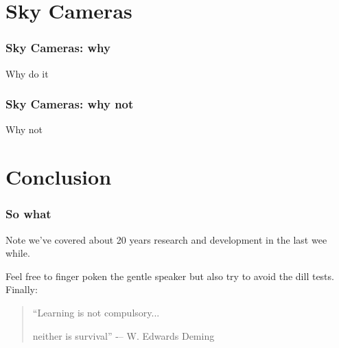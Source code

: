 \documentclass{beamer}
\begin{document}
\section{Sky Cameras}
\begin{frame}\frametitle{Sky Cameras: why}
Why do it
\end{frame}

\begin{frame}\frametitle{Sky Cameras: why not}
Why not
\end{frame}

\section{Conclusion}
\begin{frame}\frametitle{So what}
Note we've covered about 20 years research and development in
the last wee while.\pause

Feel free to finger poken the gentle speaker but also try to avoid the
dill tests.  \vfill \pause Finally:
\begin{quote}
“Learning is not compulsory...

\pause
neither is survival” -– W. Edwards Deming
\end{quote}
\end{frame}
\end{document}
